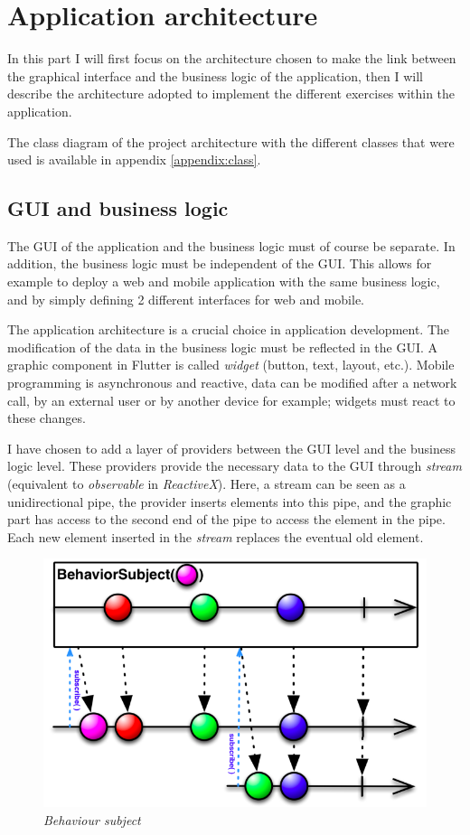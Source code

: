\section{Application architecture}

In this part I will first focus on the architecture chosen to make the link between the graphical interface and the business logic of the application, then I will describe the architecture adopted to implement the different exercises within the application.

The class diagram of the project architecture with the different classes that were used is available in appendix \ref{appendix:class}.

\subsection{GUI and business logic}
The GUI of the application and the business logic must of course be separate. In addition, the business logic must be independent of the GUI. This allows for example to deploy a web and mobile application with the same business logic, and by simply defining 2 different interfaces for web and mobile.

The application architecture is a crucial choice in application development. The modification of the data in the business logic must be reflected in the GUI. A graphic component in Flutter is called \textit{widget} (button, text, layout, etc.). Mobile programming is asynchronous and reactive, data can be modified after a network call, by an external user or by another device for example; widgets must react to these changes.

I have chosen to add a layer of providers between the GUI level and the business logic level. These providers provide the necessary data to the GUI through \textit{stream} (equivalent to \textit{observable} in \textit{ReactiveX}). Here, a stream can be seen as a unidirectional pipe, the provider inserts elements into this pipe, and the graphic part has access to the second end of the pipe to access the element in the pipe. Each new element inserted in the \textit{stream} replaces the eventual old element.

\begin{figure}[H]
  \includegraphics[width=.7\linewidth]{content/imgs/stream.png}
  \caption{\textit{Behaviour subject}}
  \label{fig:stream}
\end{figure}

